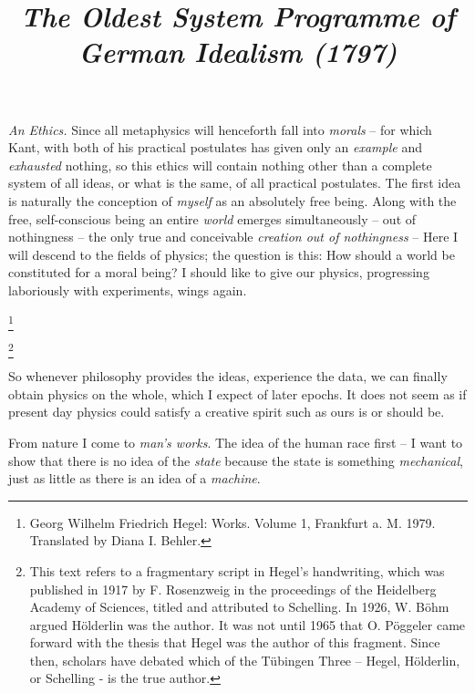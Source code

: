 \documentclass[12pt,letterpaper]{article} %
\newcommand\blfootnote[1]{%
  \begingroup
  \renewcommand\thefootnote{}\footnote{#1}%
  \addtocounter{footnote}{-1}%
  \endgroup
}
\begin{document}
\pagestyle{empty} %
\title{\textbf{\textit{\large The Oldest System Programme of German Idealism (1797)}}}
\date{} %

\maketitle
\thispagestyle{empty}
\textit{An Ethics.} Since all metaphysics will henceforth fall into \textit{morals} -- for which Kant,
with both of his practical postulates has given only an \textit{example} and \textit{exhausted} nothing, so this
ethics will contain nothing other than a complete system of all ideas, or what is the same, of
all practical postulates. The first idea is naturally the conception of \textit{myself} as an absolutely
free being. Along with the free, self-conscious being an entire \textit{world} emerges
simultaneously -- out of nothingness -- the only true and conceivable \textit{creation out of
nothingness} -- Here I will descend to the fields of physics; the question is this: How should a
world be constituted for a moral being? I should like to give our physics, progressing
laboriously with experiments, wings again.

\blfootnote{Georg Wilhelm Friedrich Hegel: Works. Volume 1, Frankfurt a. M. 1979. Translated by Diana I. Behler.}
\blfootnote{This text refers to a fragmentary script in Hegel's handwriting, which was published in 1917 by F. Rosenzweig in the proceedings of the Heidelberg Academy of Sciences, titled and attributed to Schelling. In 1926, W. Böhm argued Hölderlin was the author. It was not until 1965 that O. Pöggeler came forward with the thesis that Hegel was the author of this fragment. Since then, scholars have debated which of the Tübingen Three – Hegel, Hölderlin, or Schelling - is the true author.}
So whenever philosophy provides the ideas, experience the data, we can finally obtain
physics on the whole, which I expect of later epochs. It does not seem as if present day
physics could satisfy a creative spirit such as ours is or should be.

From nature I come to \textit{man's works}. The idea of the human race first -- I want to show
that there is no idea of the \textit{state} because the state is something \textit{mechanical}, just as little as
there is an idea of a \textit{machine}.
\end{document}
